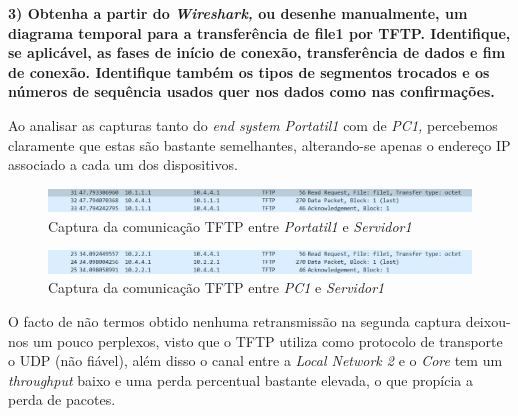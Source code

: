         \textbf{3) Obtenha a partir do \textit{Wireshark,} ou desenhe manualmente, um diagrama temporal para a transferência de file1 por TFTP. Identifique, se aplicável, as fases de início de conexão, transferência de dados e fim de conexão. Identifique também os tipos de segmentos trocados e os números de sequência usados quer nos dados como nas confirmações.}

        Ao analisar as capturas tanto do \textit{end system} \textit{Portatil1} com  de \textit{PC1,} percebemos claramente que estas são bastante semelhantes, alterando-se apenas o endereço IP associado a cada um dos dispositivos.

        \newpage
        \begin{figure}[hb!]
            \centering
            \includegraphics[width=\textwidth]{Imagens/7.png}
            \caption{Captura da comunicação TFTP entre \textit{Portatil1} e \textit{Servidor1}}
            \vspace{-10pt}
        \end{figure}

        \begin{figure}[hb!]
            \centering
            \includegraphics[width=\textwidth]{Imagens/8.png}
            \caption{Captura da comunicação TFTP entre \textit{PC1} e \textit{Servidor1}}
            \vspace{-10pt}
        \end{figure}

        O facto de não termos obtido nenhuma retransmissão na segunda captura deixou-nos um pouco perplexos, visto que o TFTP utiliza como protocolo de transporte o UDP (não fiável), além disso o canal entre a \textit{Local Network 2} e o \textit{Core} tem um \textit{throughput} baixo e uma perda percentual bastante elevada, o que propícia a perda de pacotes.

